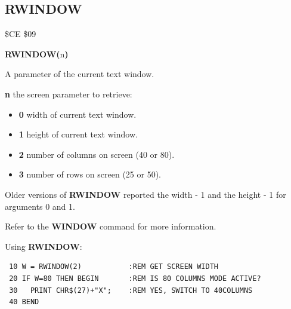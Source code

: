
\newpage
\subsection{RWINDOW}
\begin{description}[leftmargin=2cm,style=nextline]
\item [Token:] \$CE \$09
\item [Format:] {\bf RWINDOW(}n{\bf)}
\item [Returns:]  A parameter of the current text window.

                {\bf n} the screen parameter to retrieve:

                \begin{itemize}
                    \item {\bf 0} width of current text window.
                    \item {\bf 1} height of current text window.
                    \item {\bf 2} number of columns on screen (40 or 80).
                    \item {\bf 3} number of rows on screen (25 or 50).
                \end{itemize}

\item [Remarks:] Older versions of {\bf RWINDOW} reported
                 the width - 1 and the height - 1 for arguments 0 and 1.

                 Refer to the {\bf WINDOW} command for more information.

\item [Example:] Using {\bf RWINDOW}:
\begin{tcolorbox}[colback=black,coltext=white]
\verbatimfont{\codefont}
\begin{verbatim}
 10 W = RWINDOW(2)           :REM GET SCREEN WIDTH
 20 IF W=80 THEN BEGIN       :REM IS 80 COLUMNS MODE ACTIVE?
 30   PRINT CHR$(27)+"X";    :REM YES, SWITCH TO 40COLUMNS
 40 BEND
\end{verbatim}
\end{tcolorbox}
\end{description}


\newpage
